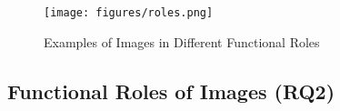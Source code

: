 
\begin{figure*}[t]
    \centering
    \vspace{10pt}
     \texttt{[image: figures/roles.png]}
    \caption{Examples of Images in Different Functional Roles}
    \label{fig:roles}
\end{figure*}



\subsection{Functional Roles of Images (RQ2)}
\label{rq2}


%

